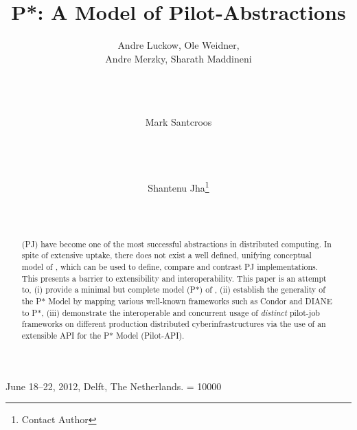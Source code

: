 \documentclass{sig-alternate}
\begin{document}
 {June 18--22, 2012, Delft, The Netherlands.} 
\widowpenalty = 10000





\title{P*: A Model of Pilot-Abstractions\up}

\author{
\alignauthor Andre Luckow, Ole Weidner, \\Andre Merzky, Sharath Maddineni\\
       \\
       \\
        \\
\and
\alignauthor Mark Santcroos\\
       \\
       \\
       \\
\and
\alignauthor Shantenu Jha\footnote{Contact Author}\\
      \\
     \\
}

\date{}

\maketitle

\let\thefootnote\relax{}

\vspace{-2cm}
\begin{abstract} 
  \pilotjobs (PJ) have become one of the most successful abstractions in
  distributed computing. In spite of extensive uptake, there does not
  exist a well defined, unifying conceptual model of \pilotjobs, which
  can be used to define, compare and contrast PJ
  implementations. This presents a barrier to extensibility and
  interoperability. This paper is an attempt to, (i) provide a minimal
  but complete model (P*) of \pilotjobs, (ii) establish the generality
  of the P* Model by mapping various well-known \pilotjob
  frameworks such as Condor and DIANE to P*, (iii) demonstrate the
  interoperable and concurrent usage of {\it distinct} pilot-job
  frameworks on different production distributed cyberinfrastructures
  via the use of an extensible API for the P* Model (Pilot-API).
\end{abstract}
\end{document}

